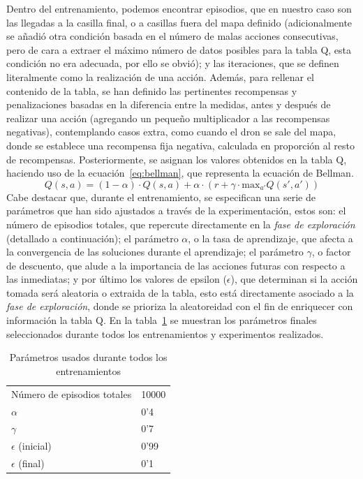 Dentro del entrenamiento, podemos encontrar episodios, que en nuestro caso son las llegadas a la casilla final, o a casillas fuera del mapa definido (adicionalmente se añadió otra condición basada en el número de malas acciones consecutivas, pero de cara a extraer el máximo número de datos posibles para la tabla Q, esta condición no era adecuada, por ello se obvió); y las iteraciones, que se definen literalmente como la realización de una acción. Además, para rellenar el contenido de la tabla, se han definido las pertinentes recompensas y penalizaciones basadas en la diferencia entre la medidas, antes y después de realizar una acción (agregando un pequeño multiplicador a las recompensas negativas), contemplando casos extra, como cuando el dron se sale del mapa, donde se establece una recompensa fija negativa, calculada en proporción al resto de recompensas. Posteriormente, se asignan los valores obtenidos en la tabla Q, haciendo uso de la ecuación~\ref{eq:bellman}, que representa la ecuación de Bellman.
\begin{equation}
    Q(s, a) = (1 - \alpha) \cdot Q(s, a) + \alpha \cdot \left(r + \gamma \cdot \mathrm{max}_{a'} Q(s', a')\right)
    \label{eq:bellman}
\end{equation}
Cabe destacar que, durante el entrenamiento, se especifican una serie de parámetros que han sido ajustados a través de la experimentación, estos son: el número de episodios totales, que repercute directamente en la \emph{fase de exploración} (detallado a continuación); el parámetro $\alpha$, o la tasa de aprendizaje, que afecta a la convergencia de las soluciones durante el aprendizaje; el parámetro $\gamma$, o factor de descuento, que alude a la importancia de las acciones futuras con respecto a las inmediatas; y por último los valores de epsilon ($\epsilon$), que determinan si la acción tomada será aleatoria o extraida de la tabla, esto está directamente asociado a la \emph{fase de exploración}, donde se prioriza la aleatoreidad con el fin de enriquecer con información la tabla Q. En la tabla~\ref{table:params} se muestran los parámetros finales seleccionados durante todos los entrenamientos y experimentos realizados.\\

\begin{table}
    \centering
    \begin{tabular}{ll}
    Número de episodios totales & 10000 \\
    $\alpha$                       & 0'4   \\
    $\gamma$                       & 0'7   \\
    $\epsilon$ (inicial)           & 0'99  \\
    $\epsilon$ (final)             & 0'1   \\
    \end{tabular}
    \caption[Parámetros usados durante todos los entrenamientos]{Parámetros usados durante todos los entrenamientos}
    \label{table:params}
\end{table}

